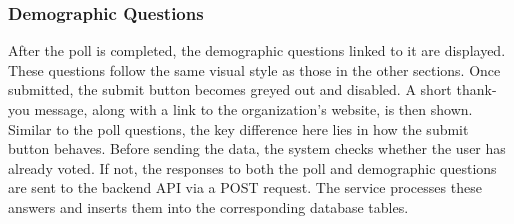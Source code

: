 \documentclass[a4paper,12pt]{report}
\begin{document}
\subsubsection{Demographic Questions}
After the poll is completed, the demographic questions linked to it are displayed. These questions follow the same visual style as those in the other sections. Once submitted, the submit button becomes greyed out and disabled. A short thank-you message, along with a link to the organization's website, is then shown. Similar to the poll questions, the key difference here lies in how the submit button behaves. Before sending the data, the system checks whether the user has already voted. If not, the responses to both the poll and demographic questions are sent to the backend API via a POST request. The service processes these answers and inserts them into the corresponding database tables.
\end{document}
